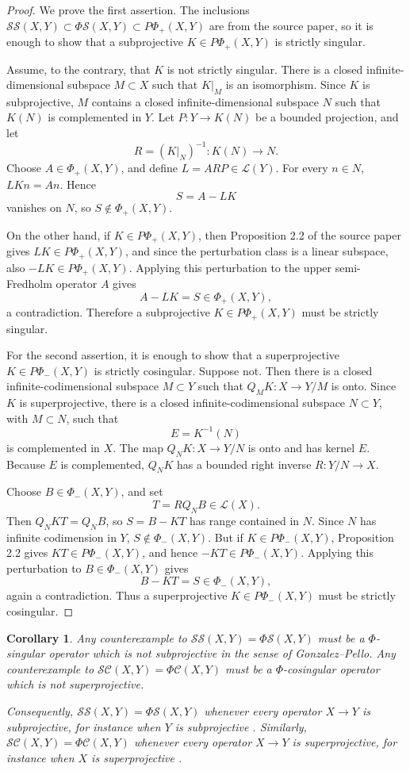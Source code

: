 \documentclass[11pt]{article}
\newtheorem{corollary}{Corollary}
\newcommand{\LL}{\mathcal L}
\newcommand{\SSing}{\mathcal{SS}}
\newcommand{\SCos}{\mathcal{SC}}
\newcommand{\PhiS}{\Phi\mathcal S}
\newcommand{\PhiC}{\Phi\mathcal C}
\begin{document}
\begin{proof}
We prove the first assertion.  The inclusions
\(\SSing(X,Y)\subset\PhiS(X,Y)\subset P\Phi_+(X,Y)\) are from the source
paper, so it is enough to show that a subprojective \(K\in P\Phi_+(X,Y)\) is
strictly singular.

Assume, to the contrary, that \(K\) is not strictly singular.  There is a
closed infinite-dimensional subspace \(M\subset X\) such that \(K|_M\) is an
isomorphism.  Since \(K\) is subprojective, \(M\) contains a closed
infinite-dimensional subspace \(N\) such that \(K(N)\) is complemented in
\(Y\).  Let \(P:Y\to K(N)\) be a bounded projection, and let
\[
R=(K|_N)^{-1}:K(N)\to N.
\]
Choose \(A\in\Phi_+(X,Y)\), and define \(L=ARP\in\LL(Y)\).  For every
\(n\in N\), \(LKn=An\).  Hence
\[
S=A-LK
\]
vanishes on \(N\), so \(S\notin\Phi_+(X,Y)\).

On the other hand, if \(K\in P\Phi_+(X,Y)\), then Proposition 2.2 of the
source paper gives \(LK\in P\Phi_+(X,Y)\), and since the perturbation class is
a linear subspace, also \(-LK\in P\Phi_+(X,Y)\).  Applying this perturbation
to the upper semi-Fredholm operator \(A\) gives
\[
A-LK=S\in\Phi_+(X,Y),
\]
a contradiction.  Therefore a subprojective \(K\in P\Phi_+(X,Y)\) must be
strictly singular.

For the second assertion, it is enough to show that a superprojective
\(K\in P\Phi_-(X,Y)\) is strictly cosingular.  Suppose not.  Then there is a
closed infinite-codimensional subspace \(M\subset Y\) such that
\(Q_MK:X\to Y/M\) is onto.  Since \(K\) is superprojective, there is a closed
infinite-codimensional subspace \(N\subset Y\), with \(M\subset N\), such that
\[
E=K^{-1}(N)
\]
is complemented in \(X\).  The map \(Q_NK:X\to Y/N\) is onto and has kernel
\(E\).  Because \(E\) is complemented, \(Q_NK\) has a bounded right inverse
\(R:Y/N\to X\).

Choose \(B\in\Phi_-(X,Y)\), and set
\[
T=R Q_N B\in\LL(X).
\]
Then \(Q_NKT=Q_NB\), so \(S=B-KT\) has range contained in \(N\).  Since \(N\)
has infinite codimension in \(Y\), \(S\notin\Phi_-(X,Y)\).  But if
\(K\in P\Phi_-(X,Y)\), Proposition 2.2 gives \(KT\in P\Phi_-(X,Y)\), and
hence \(-KT\in P\Phi_-(X,Y)\).  Applying this perturbation to
\(B\in\Phi_-(X,Y)\) gives
\[
B-KT=S\in\Phi_-(X,Y),
\]
again a contradiction.  Thus a superprojective \(K\in P\Phi_-(X,Y)\) must be
strictly cosingular.
\end{proof}

\begin{corollary}
Any counterexample to \(\SSing(X,Y)=\PhiS(X,Y)\) must be a
\(\Phi\)-singular operator which is not subprojective in the sense of
Gonzalez--Pello.  Any counterexample to \(\SCos(X,Y)=\PhiC(X,Y)\) must be a
\(\Phi\)-cosingular operator which is not superprojective.

Consequently, \(\SSing(X,Y)=\PhiS(X,Y)\) whenever every operator
\(X\to Y\) is subprojective, for instance when \(Y\) is subprojective
\cite[Corollary 2.4]{GP24}.  Similarly,
\(\SCos(X,Y)=\PhiC(X,Y)\) whenever every operator \(X\to Y\) is
superprojective, for instance when \(X\) is superprojective
\cite[Corollary 2.4]{GP24}.
\end{corollary}
\end{document}
